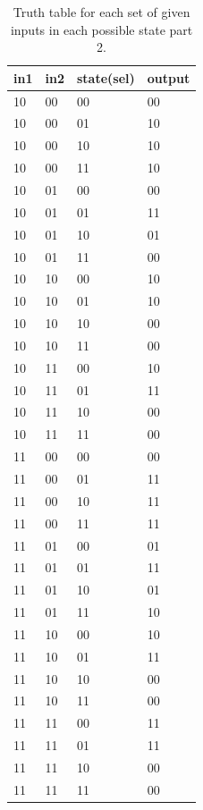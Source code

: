 \documentclass[11pt]{article}
\begin{document}
\begin{table}[H]
\begin{center}
\begin{tabular}{| l | l | l | l |}
	\hline
	in1 & in2 & state(sel) & output \\ \hline
	10 & 00 & 00 & 00 \\ \hline
	10 & 00 & 01 & 10 \\ \hline
	10 & 00 & 10 & 10 \\ \hline
	10 & 00 & 11 & 10 \\ \hline
	10 & 01 & 00 & 00 \\ \hline
	10 & 01 & 01 & 11 \\ \hline
	10 & 01 & 10 & 01 \\ \hline
	10 & 01 & 11 & 00 \\ \hline
	10 & 10 & 00 & 10 \\ \hline
	10 & 10 & 01 & 10 \\ \hline
	10 & 10 & 10 & 00 \\ \hline
	10 & 10 & 11 & 00 \\ \hline
	10 & 11 & 00 & 10 \\ \hline
	10 & 11 & 01 & 11 \\ \hline
	10 & 11 & 10 & 00 \\ \hline
	10 & 11 & 11 & 00 \\ \hline
	11 & 00 & 00 & 00 \\ \hline
	11 & 00 & 01 & 11 \\ \hline
	11 & 00 & 10 & 11 \\ \hline
	11 & 00 & 11 & 11 \\ \hline
	11 & 01 & 00 & 01 \\ \hline
	11 & 01 & 01 & 11 \\ \hline
	11 & 01 & 10 & 01 \\ \hline
	11 & 01 & 11 & 10 \\ \hline
	11 & 10 & 00 & 10 \\ \hline
	11 & 10 & 01 & 11 \\ \hline
	11 & 10 & 10 & 00 \\ \hline
	11 & 10 & 11 & 00 \\ \hline
	11 & 11 & 00 & 11 \\ \hline
	11 & 11 & 01 & 11 \\ \hline
	11 & 11 & 10 & 00 \\ \hline
	11 & 11 & 11 & 00 \\ \hline
\end{tabular}
\caption{\label{tab:integrated_truth_table2}Truth table for each set of given inputs in each possible state part 2.}
\end{center}
\end{table}
\end{document}

